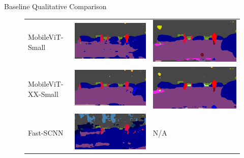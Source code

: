 \documentclass{lib/curtin_format}
\begin{document}
\begin{frame}{Baseline Qualitative Comparison}
    \begin{figure}[]
        \centering
        \begin{tabular}{lll}
            MobileViT-Small    & \includegraphics[width=.3\linewidth]{res/lightweight-uda-baseline-qualitative/mobilevit-small-sourceonly.png}    & \includegraphics[width=.3\linewidth]{res/lightweight-uda-baseline-qualitative/mobilevit-small-selftraining.png}    \\
            MobileViT-XX-Small & \includegraphics[width=.3\linewidth]{res/lightweight-uda-baseline-qualitative/mobilevit-xx-small-sourceonly.png} & \includegraphics[width=.3\linewidth]{res/lightweight-uda-baseline-qualitative/mobilevit-xx-small-selftraining.png} \\
            Fast-SCNN          & \includegraphics[width=.3\linewidth]{res/lightweight-uda-baseline-qualitative/fast-scnn-sourceonly.png}          & N/A                                                                                                                \\
        \end{tabular}
    \end{figure}
\end{frame}
\end{document}
